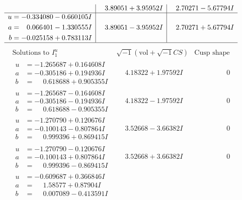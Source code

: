 \documentclass[1p]{elsarticle_modified}
\theoremstyle{definition}
\newcommand{\I}{\sqrt{-1}}
\begin{document}
$$\begin{array}{c|c|c}
 & \phantom{-}3.89051 + 3.95952 I & \phantom{-}2.70271 - 5.67794 I \\ \hline\begin{aligned}
u &= -0.334080 - 0.660105 I \\
a &= \phantom{-}0.066401 - 1.330555 I \\
b &= -0.025158 + 0.783113 I\end{aligned}
 & \phantom{-}3.89051 - 3.95952 I & \phantom{-}2.70271 + 5.67794 I\\
 \hline 
 \end{array}$$\newpage$$\begin{array}{c|c|c}  
\text{Solutions to }I^u_{1}& \I (\text{vol} + \sqrt{-1}CS) & \text{Cusp shape}\\
 \hline 
\begin{aligned}
u &= -1.265687 + 0.164608 I \\
a &= -0.305186 + 0.194936 I \\
b &= \phantom{-}0.618688 + 0.905355 I\end{aligned}
 & \phantom{-}4.18322 + 1.97592 I & \phantom{-0.000000 } 0 \\ \hline\begin{aligned}
u &= -1.265687 - 0.164608 I \\
a &= -0.305186 - 0.194936 I \\
b &= \phantom{-}0.618688 - 0.905355 I\end{aligned}
 & \phantom{-}4.18322 - 1.97592 I & \phantom{-0.000000 } 0 \\ \hline\begin{aligned}
u &= -1.270790 + 0.120676 I \\
a &= -0.100143 - 0.807864 I \\
b &= \phantom{-}0.999396 + 0.869415 I\end{aligned}
 & \phantom{-}3.52668 - 3.66382 I & \phantom{-0.000000 } 0 \\ \hline\begin{aligned}
u &= -1.270790 - 0.120676 I \\
a &= -0.100143 + 0.807864 I \\
b &= \phantom{-}0.999396 - 0.869415 I\end{aligned}
 & \phantom{-}3.52668 + 3.66382 I & \phantom{-0.000000 } 0 \\ \hline\begin{aligned}
u &= -0.609687 + 0.366846 I \\
a &= \phantom{-}1.58577 + 0.87904 I \\
b &= \phantom{-}0.007089 - 0.413591 I\end{aligned}

\end{array}$$
\end{document}
